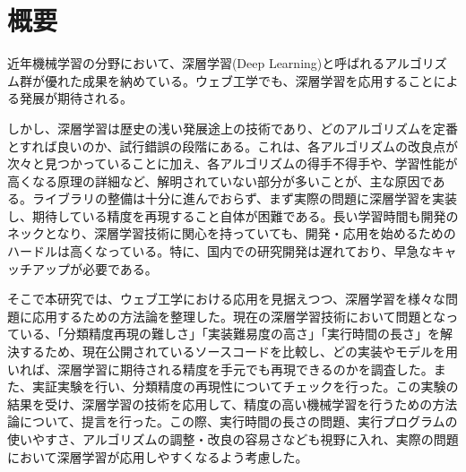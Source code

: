 \chapter*{概要}
近年機械学習の分野において、深層学習(Deep Learning)と呼ばれるアルゴリズム群が優れた成果を納めている。ウェブ工学でも、深層学習を応用することによる発展が期待される。\par
しかし、深層学習は歴史の浅い発展途上の技術であり、どのアルゴリズムを定番とすれば良いのか、試行錯誤の段階にある。これは、各アルゴリズムの改良点が次々と見つかっていることに加え、各アルゴリズムの得手不得手や、学習性能が高くなる原理の詳細など、解明されていない部分が多いことが、主な原因である。ライブラリの整備は十分に進んでおらず、まず実際の問題に深層学習を実装し、期待している精度を再現すること自体が困難である。長い学習時間も開発のネックとなり、深層学習技術に関心を持っていても、開発・応用を始めるためのハードルは高くなっている。特に、国内での研究開発は遅れており、早急なキャッチアップが必要である。\par
そこで本研究では、ウェブ工学における応用を見据えつつ、深層学習を様々な問題に応用するための方法論を整理した。現在の深層学習技術において問題となっている、「分類精度再現の難しさ」「実装難易度の高さ」「実行時間の長さ」を解決するため、現在公開されているソースコードを比較し、どの実装やモデルを用いれば、深層学習に期待される精度を手元でも再現できるのかを調査した。また、実証実験を行い、分類精度の再現性についてチェックを行った。この実験の結果を受け、深層学習の技術を応用して、精度の高い機械学習を行うための方法論について、提言を行った。この際、実行時間の長さの問題、実行プログラムの使いやすさ、アルゴリズムの調整・改良の容易さなども視野に入れ、実際の問題において深層学習が応用しやすくなるよう考慮した。